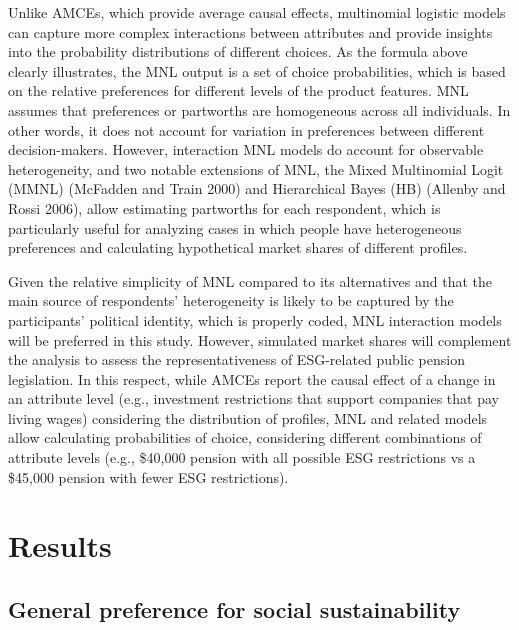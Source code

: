 \documentclass[
  12pt,
]{article}
\begin{document}
Unlike AMCEs, which provide average causal effects, multinomial logistic models can capture more complex interactions between attributes and provide insights into the probability distributions of different choices. As the formula above clearly illustrates, the MNL output is a set of choice probabilities, which is based on the relative preferences for different levels of the product features. MNL assumes that preferences or partworths are homogeneous across all individuals. In other words, it does not account for variation in preferences between different decision-makers. However, interaction MNL models do account for observable heterogeneity, and two notable extensions of MNL, the Mixed Multinomial Logit (MMNL) (McFadden and Train 2000) and Hierarchical Bayes (HB) (Allenby and Rossi 2006), allow estimating partworths for each respondent, which is particularly useful for analyzing cases in which people have heterogeneous preferences and calculating hypothetical market shares of different profiles.

Given the relative simplicity of MNL compared to its alternatives and that the main source of respondents' heterogeneity is likely to be captured by the participants' political identity, which is properly coded, MNL interaction models will be preferred in this study. However, simulated market shares will complement the analysis to assess the representativeness of ESG-related public pension legislation. In this respect, while AMCEs report the causal effect of a change in an attribute level (e.g., investment restrictions that support companies that pay living wages) considering the distribution of profiles, MNL and related models allow calculating probabilities of choice, considering different combinations of attribute levels (e.g., \$40,000 pension with all possible ESG restrictions vs a \$45,000 pension with fewer ESG restrictions).

\hypertarget{results}{%
\section{Results}\label{results}}

\hypertarget{general-preference-for-social-sustainability}{%
\subsection{General preference for social sustainability}\label{general-preference-for-social-sustainability}}
\end{document}
